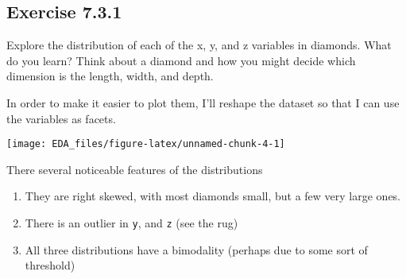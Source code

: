 \documentclass[]{book}
\newenvironment{Shaded}{\begin{snugshade}}{\end{snugshade}}
\newcommand{\DataTypeTok}[1]{\textcolor[rgb]{0.13,0.29,0.53}{#1}}
\newcommand{\KeywordTok}[1]{\textcolor[rgb]{0.13,0.29,0.53}{\textbf{#1}}}
\newcommand{\NormalTok}[1]{#1}
\newcommand{\OperatorTok}[1]{\textcolor[rgb]{0.81,0.36,0.00}{\textbf{#1}}}
\newcommand{\StringTok}[1]{\textcolor[rgb]{0.31,0.60,0.02}{#1}}
\providecommand{\tightlist}{%
  \setlength{\itemsep}{0pt}\setlength{\parskip}{0pt}}
\theoremstyle{plain}
\theoremstyle{remark}
\theoremstyle{definition}
\theoremstyle{definition}
\theoremstyle{definition}
\theoremstyle{remark}
\begin{document}
\hypertarget{exercise-7.3.1}{%
\subsection*{\texorpdfstring{Exercise
{7.3.1}}{Exercise 7.3.1}}\label{exercise-7.3.1}}

Explore the distribution of each of the x, y, and z variables in
diamonds. What do you learn? Think about a diamond and how you might
decide which dimension is the length, width, and depth.

In order to make it easier to plot them, I'll reshape the dataset so
that I can use the variables as facets.

\begin{Shaded}
\end{Shaded}

\begin{center}\texttt{[image: EDA\_files/figure-latex/unnamed-chunk-4-1]} \end{center}

There several noticeable features of the distributions

\begin{enumerate}
\def\labelenumi{\arabic{enumi}.}
\tightlist
\item
  They are right skewed, with most diamonds small, but a few very large
  ones.
\item
  There is an outlier in \texttt{y}, and \texttt{z} (see the rug)
\item
  All three distributions have a bimodality (perhaps due to some sort of
  threshold)
\end{enumerate}
\end{document}
